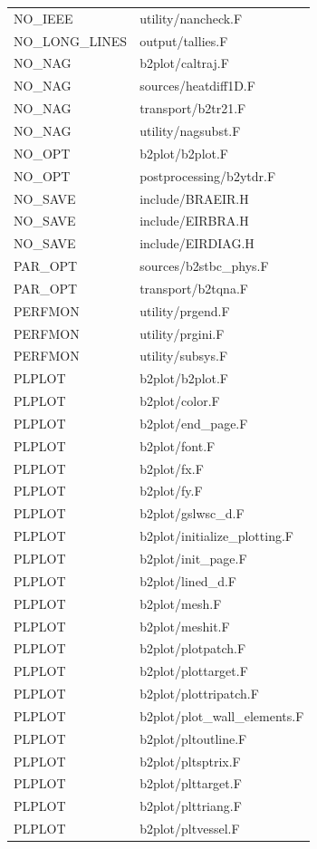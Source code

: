 \documentclass[a4paper,10pt]{report}
\begin{document}
\begin{center}
\begin{longtable}{|l|l|}
NO\_IEEE & utility/nancheck.F \\
NO\_LONG\_LINES & output/tallies.F \\
NO\_NAG & b2plot/caltraj.F \\
NO\_NAG & sources/heatdiff1D.F \\
NO\_NAG & transport/b2tr21.F \\
NO\_NAG & utility/nagsubst.F \\
NO\_OPT & b2plot/b2plot.F \\
NO\_OPT & postprocessing/b2ytdr.F \\
NO\_SAVE & include/BRAEIR.H \\
NO\_SAVE & include/EIRBRA.H \\
NO\_SAVE & include/EIRDIAG.H \\
PAR\_OPT & sources/b2stbc\_phys.F \\
PAR\_OPT & transport/b2tqna.F \\
PERFMON & utility/prgend.F \\
PERFMON & utility/prgini.F \\
PERFMON & utility/subsys.F \\
PLPLOT & b2plot/b2plot.F \\
PLPLOT & b2plot/color.F \\
PLPLOT & b2plot/end\_page.F \\
PLPLOT & b2plot/font.F \\
PLPLOT & b2plot/fx.F \\
PLPLOT & b2plot/fy.F \\
PLPLOT & b2plot/gslwsc\_d.F \\
PLPLOT & b2plot/initialize\_plotting.F \\
PLPLOT & b2plot/init\_page.F \\
PLPLOT & b2plot/lined\_d.F \\
PLPLOT & b2plot/mesh.F \\
PLPLOT & b2plot/meshit.F \\
PLPLOT & b2plot/plotpatch.F \\
PLPLOT & b2plot/plottarget.F \\
PLPLOT & b2plot/plottripatch.F \\
PLPLOT & b2plot/plot\_wall\_elements.F \\
PLPLOT & b2plot/pltoutline.F \\
PLPLOT & b2plot/pltsptrix.F \\
PLPLOT & b2plot/plttarget.F \\
PLPLOT & b2plot/plttriang.F \\
PLPLOT & b2plot/pltvessel.F \\

\end{longtable}
\end{center}
\end{document}
